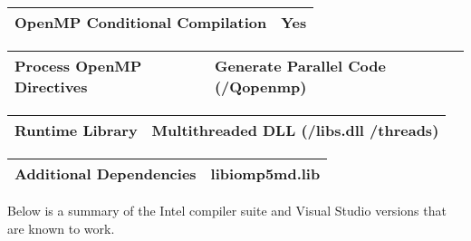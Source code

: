 \documentclass[letterpaper,10pt,english]{sphinxmanual}
\begin{document}


\begin{savenotes}\sphinxattablestart
\centering
\begin{tabulary}{\linewidth}[t]{|T|T|}
\hline

OpenMP Conditional Compilation
&
Yes
\\
\hline
\end{tabulary}
\par
\sphinxattableend\end{savenotes}



\begin{savenotes}\sphinxattablestart
\centering
\begin{tabulary}{\linewidth}[t]{|T|T|}
\hline

Process OpenMP Directives
&
Generate Parallel Code (/Qopenmp)
\\
\hline
\end{tabulary}
\par
\sphinxattableend\end{savenotes}



\begin{savenotes}\sphinxattablestart
\centering
\begin{tabulary}{\linewidth}[t]{|T|T|}
\hline

Runtime Library
&
Multithreaded DLL (/libs.dll /threads)
\\
\hline
\end{tabulary}
\par
\sphinxattableend\end{savenotes}



\begin{savenotes}\sphinxattablestart
\centering
\begin{tabulary}{\linewidth}[t]{|T|T|}
\hline

Additional Dependencies
&
libiomp5md.lib
\\
\hline
\end{tabulary}
\par
\sphinxattableend\end{savenotes}

Below is a summary of the Intel compiler suite and Visual Studio versions that are known to work.
\end{document}
